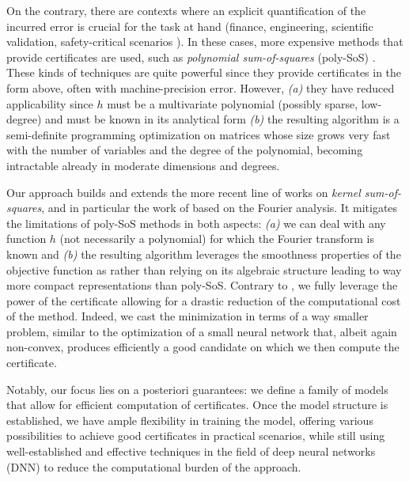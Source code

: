 \documentclass{article}
\begin{document}
On the contrary, there are contexts where an explicit quantification of the incurred error is crucial for the task at hand (finance, engineering, scientific validation, safety-critical scenarios \cite{lasserreMomentsPositivePolynomials2009}). In these cases, more expensive methods that provide certificates are used, such as \emph{polynomial sum-of-squares} (poly-SoS) \cite{lasserreGlobalOptimizationPolynomials2001,lasserreMomentsPositivePolynomials2009}. These kinds of techniques are quite powerful since they provide certificates in the form above, often with machine-precision error. However, \emph{(a)} they have reduced applicability since $h$ must be a multivariate polynomial (possibly sparse, low-degree) and must be known in its analytical form \emph{(b)} the resulting algorithm is a semi-definite programming optimization on matrices whose size grows very fast with the number of variables and the degree of the polynomial, becoming intractable already in moderate dimensions and degrees.

Our approach builds and extends the more recent line of works on \emph{kernel sum-of-squares}, and in particular the work of \citet{woodworthNonConvexOptimizationCertificates2022} based on the Fourier analysis. It mitigates the limitations of poly-SoS methods in both aspects: \emph{(a)} we can deal with any function $h$ (not necessarily a polynomial) for which the Fourier transform is known and \emph{(b)} the resulting algorithm leverages the smoothness properties of the objective function as \cite{woodworthNonConvexOptimizationCertificates2022} rather than relying on its algebraic structure leading to way more compact representations than poly-SoS. Contrary to \cite{woodworthNonConvexOptimizationCertificates2022}, we fully leverage the power of the certificate allowing for a drastic reduction of the computational cost of the method. Indeed, we cast the minimization in terms of a way smaller problem, similar to the optimization of a small neural network that, albeit again non-convex, produces efficiently a good candidate on which we then compute the certificate.

Notably, our focus lies on a posteriori guarantees: we define a family of models that allow for efficient computation of certificates. Once the model structure is established, we have ample flexibility in training the model, offering various possibilities to achieve good certificates in practical scenarios, while still using well-established and effective techniques in the field of deep neural networks (DNN) \cite{goodfellow2016deep} to reduce the computational burden of the approach.
\end{document}
